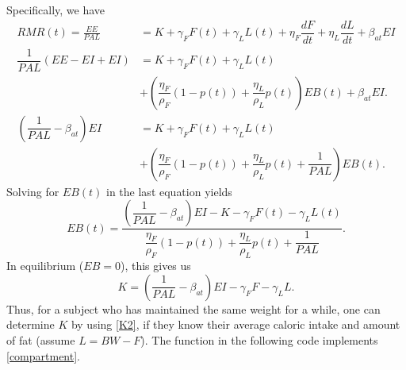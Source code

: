 Specifically, we have
\begin{align*}
RMR(t) = \frac{EE}{PAL}&= K + \gamma_F F(t) + \gamma_L L(t) + \eta_F \dfrac{dF}{dt} + \eta_L \dfrac{dL}{dt}  + \beta_{at} EI\\
\dfrac{1}{PAL}\left(EE - EI + EI \right) &= K + \gamma_F F(t) + \gamma_L L(t) \\
&+ \left(\dfrac{\eta_F}{\rho_F} (1-p(t)) + \dfrac{\eta_L}{\rho_L} p(t) \right) EB(t) + \beta_{at} EI.\\
\left(\dfrac{1}{PAL}-\beta_{at}\right) EI &= K + \gamma_F F(t) + \gamma_L L(t) \\
&+ \left(\dfrac{\eta_F}{\rho_F} (1-p(t)) + \dfrac{\eta_L}{\rho_L} p(t) + \dfrac{1}{PAL}\right) EB(t).
\end{align*}
Solving for $EB(t)$ in the last equation yields
\begin{equation}
\label{EB2}
EB(t) = \dfrac{\left( \dfrac{1}{PAL} - \beta_{at} \right) EI - K - \gamma_F F(t) - \gamma_L L(t)}{\dfrac{\eta_F}{\rho_F} (1-p(t)) + \dfrac{\eta_L}{\rho_L} p(t) + \dfrac{1}{PAL}}.
\end{equation}
In equilibrium ($EB = 0$), this gives us
\begin{equation}
\label{K2}
K = \left(\dfrac{1}{PAL}-\beta_{at}\right) EI - \gamma_F F - \gamma_L L.
\end{equation}
Thus, for a subject who has maintained the same weight for a while, one can determine $K$ by using \eqref{K2}, if they know their average caloric intake and amount of fat (assume $L=BW-F$). The function  in the following code implements \eqref{compartment}.

